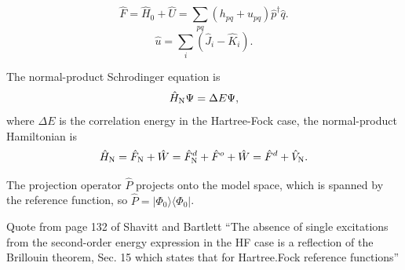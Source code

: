 \documentclass[a4paper, 11pt, notitlepage, english]{article}
\newcommand{\bra}[1]{\langle #1|}
\newcommand{\ket}[1]{|#1 \rangle}
\newcommand{\op}[1]{\hat{#1}}
\begin{document}
$$\op{F} = \op{H}_0 + \op{U} = \sum_{pq} (h_{pq} + u_{pq})\op{p}^\dagger \op{q}.$$
$$\op{u} = \sum_i (\op{J}_i - \op{K}_i).$$

The normal-product Schrodinger equation is
$$\op{H}_{\rm N} \Psi = \Delta E \Psi,$$
where $\Delta E$ is the correlation energy in the Hartree-Fock case, the normal-product Hamiltonian is
$$\op{H}_{\rm N} = \op{F}_{\rm N} + \op{W} = \op{F}^d_{\rm N} + \op{F}^o + \op{W} = \op{F}^d + \op{V}_{\rm N}.$$


The projection operator $\op{P}$ projects onto the model space, which is spanned by the reference function, so $\op{P} = \ket{\Phi_0}\bra{\Phi_0}$.


Quote from page 132 of Shavitt and Bartlett
``The absence of single excitations from the second-order energy expression in the HF case is a reflection of the Brillouin theorem, Sec. 15 which states that for Hartree.Fock reference functions''
\end{document}
